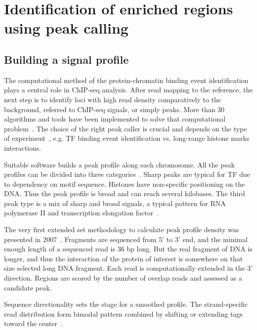 \chapter{Identification of enriched regions using peak calling}

\section{Building a signal profile}

The computational method of the protein-chromatin binding event identification plays a central role in ChIP-seq analysis. 
After read mapping to the reference, the next step is to identify loci with high read density comparatively to the background, referred to ChIP-seq signals, or simply peaks.
More than 30 algorithms and tools have been implemented to solve that computational problem~\cite{chen2012systematic}.
The choice of the right peak caller is crucial and depends on the type of experiment~\cite{nakato2017recent}, e.g. TF binding event identification vs. long-range histone marks interactions.

Suitable software builds a peak profile along each chromosome. 
All the peak profiles can be divided into three categories~\cite{park2009chip}. 
Sharp peaks are typical for TF due to dependency on motif sequence. 
Histones have non-specific positioning on the DNA. 
Thus the peak profile is broad and can reach several kilobases. 
The third peak type is a mix of sharp and broad signals, a typical pattern for RNA polymerase II and transcription elongation factor~\cite{lin2011dynamic}.

The very first extended set methodology to calculate peak profile density was presented in 2007~\cite{robertson2007genome}. 
Fragments are sequenced from 5' to 3' end, and the minimal enough length of a sequenced read is 36 bp long. 
But the real fragment of DNA is longer, and thus the interaction of the protein of interest is somewhere on that size selected long DNA fragment. 
Each read is computationally extended in the 3' direction. 
Regions are scored by the number of overlap reads and assessed as a candidate peak.

Sequence directionality sets the stage for a smoothed profile. 
The strand-specific read distribution form bimodal pattern combined by shifting or extending tags toward the center~\cite{valouev2008genome}.

